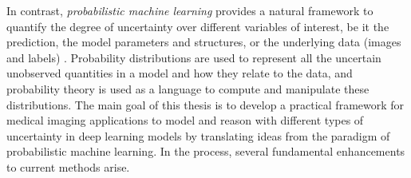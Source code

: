 In contrast, \textit{probabilistic machine learning} provides a natural framework to quantify the degree of uncertainty over different variables of interest, be it the prediction, the model parameters and structures, or the underlying data (images and labels) \cite{ghahramani2015probabilistic}. Probability distributions are used to represent all the uncertain unobserved quantities in a model and how they relate to the data, and probability theory is used as a language to compute and manipulate these distributions. The main goal of this thesis is to develop a practical framework for medical imaging applications to model and reason with different types of uncertainty in deep learning models by translating ideas from the paradigm of probabilistic machine learning. In the process, several fundamental enhancements to current methods arise. 





%
%

